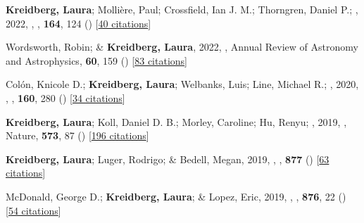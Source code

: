 \item[{\color{numcolor}\scriptsize19}] \textbf{Kreidberg, Laura}; Molli{\`e}re, Paul; Crossfield, Ian J. M.; Thorngren, Daniel P.; \etal, 2022, , \aj, \textbf{164}, 124 () [\href{https://ui.adsabs.harvard.edu/abs/2022AJ....164..124K}{40 citations}]

\item[{\color{numcolor}\scriptsize18}] Wordsworth, Robin; \& \textbf{Kreidberg, Laura}, 2022, , Annual Review of Astronomy and Astrophysics, \textbf{60}, 159 () [\href{https://ui.adsabs.harvard.edu/abs/2022ARA&A..60..159W}{83 citations}]

\item[{\color{numcolor}\scriptsize17}] Col{\'o}n, Knicole D.; \textbf{Kreidberg, Laura}; Welbanks, Luis; Line, Michael R.; \etal, 2020, , \aj, \textbf{160}, 280 () [\href{https://ui.adsabs.harvard.edu/abs/2020AJ....160..280C}{34 citations}]

\item[{\color{numcolor}\scriptsize16}] \textbf{Kreidberg, Laura}; Koll, Daniel D. B.; Morley, Caroline; Hu, Renyu; \etal, 2019, , Nature, \textbf{573}, 87 () [\href{https://ui.adsabs.harvard.edu/abs/2019Natur.573...87K}{196 citations}]

\item[{\color{numcolor}\scriptsize15}] \textbf{Kreidberg, Laura}; Luger, Rodrigo; \& Bedell, Megan, 2019, , \apj, \textbf{877} () [\href{https://ui.adsabs.harvard.edu/abs/2019ApJ...877L..15K}{63 citations}]

\item[{\color{numcolor}\scriptsize14}] McDonald, George D.; \textbf{Kreidberg, Laura}; \& Lopez, Eric, 2019, , \apj, \textbf{876}, 22 () [\href{https://ui.adsabs.harvard.edu/abs/2019ApJ...876...22M}{54 citations}]

